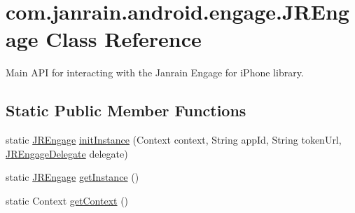 \hypertarget{classcom_1_1janrain_1_1android_1_1engage_1_1_j_r_engage}{
\section{com.janrain.android.engage.JREngage Class Reference}
\label{classcom_1_1janrain_1_1android_1_1engage_1_1_j_r_engage}
}


Main API for interacting with the Janrain Engage for iPhone library.  


\subsection*{Static Public Member Functions}
\begin{DoxyCompactItemize}
\item 
static \hyperlink{classcom_1_1janrain_1_1android_1_1engage_1_1_j_r_engage}{JREngage} \hyperlink{classcom_1_1janrain_1_1android_1_1engage_1_1_j_r_engage_ac4b60b45b0613f3ffc2854da85fa9537}{initInstance} (Context context, String appId, String tokenUrl, \hyperlink{interfacecom_1_1janrain_1_1android_1_1engage_1_1_j_r_engage_delegate}{JREngageDelegate} delegate)
\item 
static \hyperlink{classcom_1_1janrain_1_1android_1_1engage_1_1_j_r_engage}{JREngage} \hyperlink{classcom_1_1janrain_1_1android_1_1engage_1_1_j_r_engage_aa1cad88974f2885a61a83811ca8d9cfb}{getInstance} ()
\item 
static Context \hyperlink{classcom_1_1janrain_1_1android_1_1engage_1_1_j_r_engage_a93c7b388832339f12549b996953d91fb}{getContext} ()
\end{DoxyCompactItemize}
